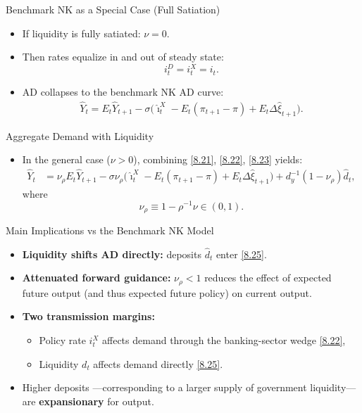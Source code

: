 \documentclass[11pt,aspectratio=169]{beamer}
\begin{document}
\begin{frame}{Benchmark NK as a Special Case (Full Satiation)}
\begin{itemize}
  \item If liquidity is fully satiated: $\nu=0$.
  \vspace{1em}
  \item Then rates equalize in and out of steady state:
  \[
    i_t^D = i_t^X = i_t.
  \]
\vspace{1em}
  \item AD collapses to the benchmark NK AD curve:
  \begin{align}
    \hat Y_t
    = E_t\hat Y_{t+1}
      - \sigma\Big(\hat\imath_t^X
      - E_t(\pi_{t+1}-\pi)
      + E_t\Delta\hat\xi_{t+1}\Big).
    \label{8.24}
  \end{align}
\end{itemize}
\end{frame}

\begin{frame}{Aggregate Demand with Liquidity}
\begin{itemize}
  \item In the general case ($\nu>0$), combining \eqref{8.21}, \eqref{8.22}, \eqref{8.23} yields:
  \begin{align}
    \hat Y_t
    &= \nu_\rho E_t \hat Y_{t+1}
     - \sigma\nu_\rho\Big(\hat\imath_t^X
      - E_t(\pi_{t+1}-\pi)
      + E_t\Delta\hat\xi_{t+1}\Big)
     + d_y^{-1}(1-\nu_\rho)\hat d_t,
     \label{8.25}
  \end{align}
  where
  \[
    \nu_\rho \equiv 1-\rho^{-1}\nu \in (0,1).
  \]
\end{itemize}
\end{frame}

\begin{frame}{Main Implications vs the Benchmark NK Model}
\begin{itemize}
  \item \textbf{Liquidity shifts AD directly:} deposits $\hat d_t$ enter \eqref{8.25}.
  \vspace{1em}
  \item \textbf{Attenuated forward guidance:} $\nu_\rho<1$ reduces the effect of expected future output (and thus expected future policy) on current output.
  \vspace{1em}
  \item \textbf{Two transmission margins:}
  \begin{itemize}
    \item Policy rate $i_t^X$ affects demand through the banking-sector wedge \eqref{8.22},
    \item Liquidity $d_t$ affects demand directly \eqref{8.25}.
  \end{itemize}
  \vspace{1em}
  \item Higher deposits ---corresponding to a larger supply of government liquidity--- are \textbf{expansionary} for output.
\end{itemize}
\end{frame}
\end{document}
